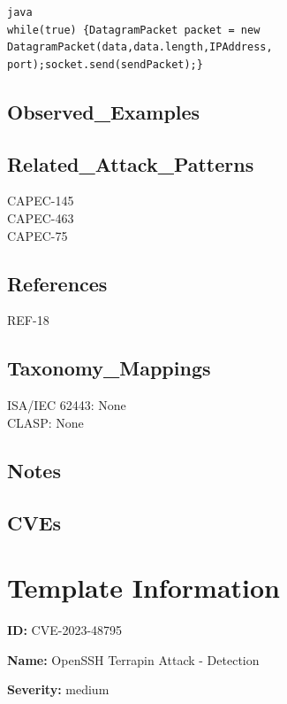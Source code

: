 \begin{lstlisting}[breaklines=true,postbreak=\mbox{$\hookrightarrow$\space}]
java
while(true) {DatagramPacket packet = new DatagramPacket(data,data.length,IPAddress, port);socket.send(sendPacket);}
\end{lstlisting}

\subsection*{Observed\_Examples}
\subsection*{Related\_Attack\_Patterns}
CAPEC-145\\
CAPEC-463\\
CAPEC-75\\
\subsection*{References}
REF-18\\
\subsection*{Taxonomy\_Mappings}
ISA/IEC 62443: None\\
CLASP: None\\
\subsection*{Notes}
\subsection*{CVEs}
\section*{Template Information}
\textbf{ID:} CVE-2023-48795

\textbf{Name:} OpenSSH Terrapin Attack - Detection

\textbf{Severity:} medium

